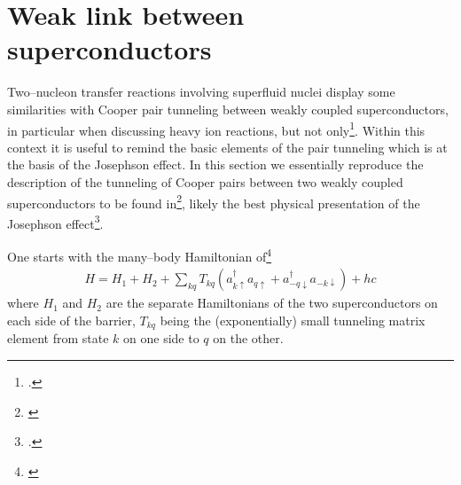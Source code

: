 
\section{Weak link between superconductors}\label{C3AppC}
Two--nucleon transfer reactions involving superfluid nuclei display some similarities with Cooper pair tunneling between weakly coupled superconductors, in particular when discussing heavy ion reactions, but not only\footnote{\cite{vonOertzen:01,Oertzen:13,Broglia:04a}.}. Within this context it is useful to remind the basic elements of the pair tunneling which is at the basis of the Josephson effect. 
In this section we essentially reproduce the description of the tunneling of Cooper pairs between two weakly coupled superconductors to be found in\footnote{\cite{Anderson:64b}}, likely the best physical presentation of the Josephson effect\footnote{\cite{Josephson:62}.}.


One starts with the many--body Hamiltonian of\footnote{\cite{Cohen:62}}
\begin{align}\label{eq3.C.1}
H=H_1+H_2+\sum_{kq}T_{kq}(a_{k\uparrow}^\dagger a_{q\uparrow}+a_{-q\downarrow}^\dagger a_{-k\downarrow})+hc
\end{align}
where $H_1$ and $H_2$ are the separate Hamiltonians of the two superconductors on each side of the barrier, $T_{kq}$ being the (exponentially) small tunneling matrix element from state $k$ on one side to $q$ on the other.


